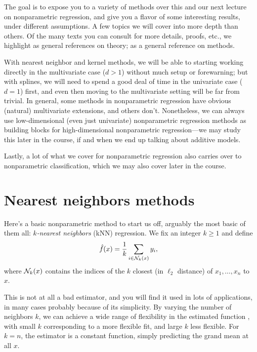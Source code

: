 \documentclass{article}
\begin{document}
The goal is to expose you to a variety of methods over this and our next lecture 
on nonparametric regression, and give you a flavor of some interesting results,  
under different assumptions. A few topics we will cover into more depth than
others. Of the many texts you can consult for more details, proofs, etc., we
highlight \citet{gyorfi2002distribution, wasserman2006all,
  tsybakov2009introduction} as general references on theory;
\citet{hastie2009elements} as a general reference on methods.

With nearest neighbor and kernel methods, we will be able to starting working
directly in the multivariate case ($d>1$) without much setup or forewarning; but
with splines, we will need to spend a good deal of time in the univariate case 
($d=1$) first, and even then moving to the multivariate setting will be far from 
trivial. In general, some methods in nonparametric regression have obvious
(natural) multivariate extensions, and others don't. Nonetheless, we can always
use low-dimensional (even just univariate) nonparametric regression methods as  
building blocks for high-dimensional nonparametric regression---we may study 
this later in the course, if and when we end up talking about additive models.    

Lastly, a lot of what we cover for nonparametric regression also carries over to
nonparametric classification, which we may also cover later in the course.  

\section{Nearest neighbors methods}

Here's a basic nonparametric method to start us off, arguably the most basic of
them all: \emph{$k$-nearest neighbors} (kNN) regression. We fix an integer $k
\geq 1$ and define 
\begin{equation}
\label{eq:knn}
\hat{f}(x) = \frac{1}{k} \sum_{i \in \mathcal{N}_k(x)} y_i,
\end{equation}
where $\mathcal{N}_k(x)$ contains the indices of the $k$ closest (in $\ell_2$ distance)
of $x_1,\dots,x_n$ to $x$. 

This is not at all a bad estimator, and you will find it used in lots of
applications, in many cases probably because of its simplicity. By varying the 
number of neighbors $k$, we can achieve a wide range of flexibility in the
estimated function \smash{$\hf$}, with small $k$ corresponding to a more
flexible fit, and large $k$ less flexible. For $k=n$, the estimator
\smash{$\hf$} is a constant function, simply predicting the grand mean
 at all $x$.
\end{document}
